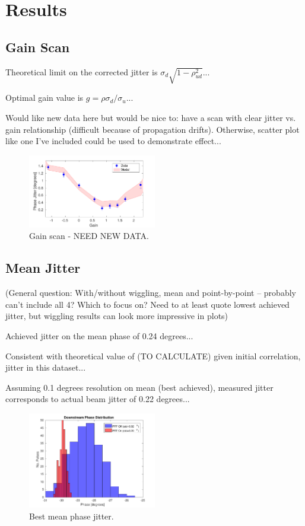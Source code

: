 \documentclass[%
 reprint,
 amsmath,amssymb,
 aps,
]{revtex4-1}
\begin{document}
\section{\label{s:results}Results}

\subsection{\label{ss:gScan}Gain Scan}

Theoretical limit on the corrected jitter is \(\sigma_d \sqrt{1-\rho_{ud}^2}\)...

Optimal gain value is \(g = \rho \sigma_d/\sigma_u\)...

Would like new data here but would be nice to: have a scan with clear jitter vs. gain relationship (difficult because of propagation drifts). Otherwise, scatter plot like one I've included could be used to demonstrate effect...

\begin{figure}
\includegraphics[width=0.5\textwidth]{figs/gScan}%
\caption{\label{fig:gScan}Gain scan - NEED NEW DATA.}
\end{figure}


\subsection{\label{ss:meanJit}Mean Jitter}

(General question: With/without wiggling, mean and point-by-point -- probably can't include all 4? Which to focus on? Need to at least quote lowest achieved jitter, but wiggling results can look more impressive in plots)

Achieved jitter on the mean phase of 0.24 degrees...

Consistent with theoretical value of (TO CALCULATE) given initial correlation, jitter in this dataset...

Assuming 0.1 degrees resolution on mean (best achieved), measured jitter corresponds to actual beam jitter of 0.22 degrees...

\begin{figure}
\includegraphics[width=0.5\textwidth]{figs/BestFF_meanJit}%
\caption{\label{fig:meanJit}Best mean phase jitter.}
\end{figure}
\end{document}
